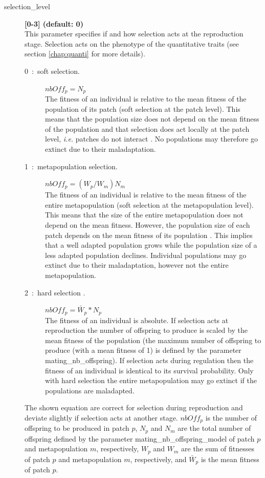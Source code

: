 \documentclass[letterpaper,12pt,oneside]{book}
\begin{document}
\begin{description}
\item[selection\_level] \textbf{[0-3] (default: 0)}\\
This parameter specifies if and how selection acts at the reproduction stage. Selection acts on the phenotype of the quantitative traits (see section \ref{chap:quanti} for more details).
\begin{description}
\item [0~:~soft selection.] $nbOff_{p} = N_{p}$\\
The fitness of an individual is relative to the mean fitness of the population of its patch (soft selection at the patch level). This means that the population size does not depend on the mean fitness of the population and that selection does act locally at the patch level, \textit{i.e.} patches do not interact \citep{Wallace_1975}. No populations may therefore go extinct due to their maladaptation.

\item [1~:~metapopulation selection.] $nbOff_{p} = (W_{p}/W_{m})N_{m}$\\
The fitness of an individual is relative to the mean fitness of the entire metapopulation (soft selection at the metapopulation level). This means that the size of the entire metapopulation does not depend on the mean fitness. However, the population size of each patch depends on the mean fitness of its population \citep{Ravigne_2004}. This implies that a well adapted population grows while the population size of a less adapted population declines. Individual populations may go extinct due to their maladaptation, however not the entire metapopulation. 

\item [2~:~hard selection .] $nbOff_{p} = \bar{W}_{p}*N_{p}$\\
The fitness of an individual is absolute. If selection acts at reproduction the number of offspring to produce is scaled by the mean fitness of the population (the maximum number of offspring to produce (with a mean fitness of 1) is defined by the parameter \textsf{mating\_nb\_offspring}). If selection acts during regulation then the fitness of an individual is identical to its survival probability. Only with hard selection the entire metapopulation may go extinct if the populations are maladapted. 


\end{description}

The shown equation are correct for selection during reproduction and deviate slightly if selection acts at another stage. $nbOff_{p}$ is the number of offspring to be produced in patch $p$, $N_{p}$ and $N_{m}$ are the total number of offspring defined by the parameter \textsf{mating\_nb\_offspring\_model} of patch $p$ and metapopulation $m$, respectively, $W_{p}$ and $W_{m}$ are the sum of fitnesses of patch $p$ and metapopulation $m$, respectively, and $\bar{W}_{p}$ is the mean fitness of patch $p$. 



\end{description}
\end{document}
